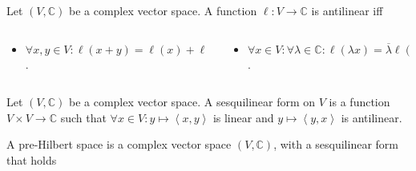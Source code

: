 \begin{frame}
	\frametitle{\secname}

	\begin{definition}
		Let $\left(V,\mathds{C}\right)$ be a complex vector space.
		A function $\ell\colon V\to\mathds{C}$ is \alert{antilinear} iff

		\begin{columns}
			\begin{column}{0.48\textwidth}
				\begin{itemize}
					\item

					      \begin{math}
						      \forall x,y\in V:
						      \ell\left(x+y\right)=
						      \ell\left(x\right)+
						      \ell\left(y\right)
					      \end{math}.
				\end{itemize}
			\end{column}
			\begin{column}{0.48\textwidth}
				\begin{itemize}
					\item

					      \begin{math}
						      \forall x\in V:\forall\lambda\in\mathds{C}:
						      \ell\left(\lambda x\right)=
						      \overline{\lambda}\ell\left(x\right)
					      \end{math}.
				\end{itemize}
			\end{column}
		\end{columns}
	\end{definition}

	\begin{definition}
		Let $\left(V,\mathds{C}\right)$ be a complex vector space.
		A \alert{sesquilinear form} on $V$ is a function
		$V\times V\to\mathds{C}$ such that
		\begin{math}
			\forall x\in V:y\mapsto\left\langle x,y\right\rangle
		\end{math}
		is linear and
		\begin{math}
			y\mapsto\left\langle y,x\right\rangle
		\end{math}
		is antilinear.
	\end{definition}

	\begin{definition}
		A \alert{pre-Hilbert space} is a complex vector space
		$\left(V,\mathds{C}\right)$, with a sesquilinear form
		that holds


\end{definition}
\end{frame}

